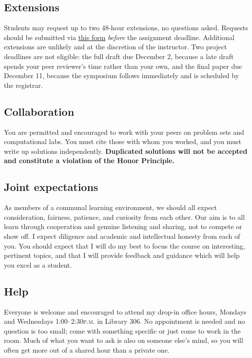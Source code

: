 \documentclass[11pt,twoside]{amsart}
\begin{document}
\subsection*{Extensions}
Students may request up to two 48-hour extensions, no questions asked. Requests should be submitted via \href{https://docs.google.com/forms/d/e/1FAIpQLSfIfgx44SFtUzefTNr-80yz35MVJaUqQttt96xVTU5mCQCOgg/viewform}{this form} \emph{before} the assignment deadline. Additional extensions are unlikely and at the discretion of the instructor.  Two project deadlines are not eligible: the full draft due December 2, because a late draft spends your peer reviewer's time rather than your own, and the final paper due December 11, because the symposium follows immediately and is scheduled by the registrar.

\subsection*{Collaboration}
You are permitted and encouraged to work with your peers on problem sets and computational labs.  You must cite those with whom you worked, and you must write up solutions independently.  \textbf{Duplicated solutions will not be accepted and constitute a violation of the Honor Principle.}

\subsection*{Joint expectations}
As members of a communal learning environment, we should all expect consideration, fairness, patience, and curiosity from each other.  Our aim is to all learn through cooperation and genuine listening and sharing, not to compete or show off.  I expect diligence and academic and intellectual honesty from each of you.  You should expect that I will do my best to focus the course on interesting, pertinent topics, and that I will provide feedback and guidance which will help you excel as a student.

\subsection*{Help}
Everyone is welcome and encouraged to attend my drop-in office hours, Mondays and Wednesdays 1:00--2:30\textsc{p.m.} in Library 306.  No appointment is needed and no question is too small; come with something specific or just come to work in the room.  Much of what you want to ask is also on someone else's mind, so you will often get more out of a shared hour than a private one.
\end{document}
